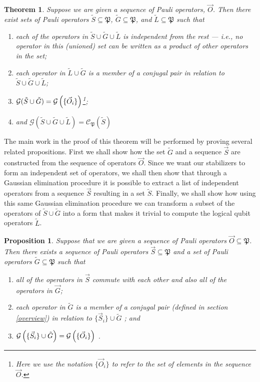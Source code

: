 \documentclass[twocolumn,showpacs,preprintnumbers,amsmath,amssymb,nofootinbib,pra,floatfix]{revtex4}
\newtheorem{theorem}{Theorem}
\newtheorem{proposition}{Proposition}
\newenvironment{remark}[1][Remark]{\begin{trivlist}
\item[\hskip \labelsep {\bfseries #1}]}{\end{trivlist}}
\newcommand{\lst}{\vec}
\newcommand{\set}{\tilde}
\newcommand{\genfun}{\mathcal{G}}
\newcommand{\pauligroup}{\mathfrak{P}}
\newcommand{\centralizer}{\mathcal{C}}
\begin{document}
\begin{theorem} \label{theorem-SG} Suppose we are given a sequence of Pauli operators, $\lst O$.  Then there exist sets of Pauli operators $\set S\subseteq\pauligroup$, $\set G\subseteq\pauligroup$, and $\set L\subseteq\pauligroup$ such that
\begin{enumerate}
\item each of the operators in $\set S \cup \set G \cup \set L$ is independent from the rest --- i.e., no operator in this (unioned) set can be written as a product of other operators in the set;
\item each operator in $\set L \cup \set G$ is a member of a conjugal pair in relation to $\set S \cup \set G \cup \set L$;
\item $\genfun(\set S \cup \set G)=\genfun\paren{\{\lst O_i\}}$\footnote{Here we use the notation $\{\vec{O}_i\}$ to refer to the set of elements in the sequence $\vec{O}$.};
\item and $\genfun(\set S \cup \set G \cup \set L)=\centralizer_\pauligroup(\set S)$
\end{enumerate}
\end{theorem}

\begin{remark}
The main work in the proof of this theorem will be performed by proving several related propositions.  First we shall show how the set $\set G$ and a sequence $\lst S$ are constructed from the sequence of operators $\lst O$.  Since we want our stabilizers to form an independent set of operators, we shall then show that through a Gaussian elimination procedure it is possible to extract a list of independent operators from a sequence $\lst S$ resulting in a set $\set S$.  Finally, we shall show how using this same Gaussian elimination procedure we can transform a subset of the operators of $\set S\cup\set G$ into a form that makes it trivial to compute the logical qubit operators $\set L$.
\end{remark}
\begin{proposition} \label{proposition-SG} Suppose that we are given a sequence of Pauli operators $\lst O\subseteq \pauligroup$.  Then there exists a sequence of Pauli operators $\lst S\subseteq\pauligroup$ and a set of Pauli operators $\set G\subseteq\pauligroup$ such that
\begin{enumerate}
\item all of the operators in $\lst S$ commute with each other and also all of the operators in $\lst G$; \label{stabs-commute-with-G}
\item each operator in $\set G$ is a member of a \emph{conjugal pair} (defined in section \ref{overview}) in relation to $\{\lst S_i\} \cup \set G $ \label{conjugal-pairs-commute-with-SAG}; and
\item $\genfun\paren{\{\lst S_i\}\cup \set G}=\genfun\paren{\{\lst O_i\}}$ \label{SAG-spans-all}.
\end{enumerate}
\end{proposition}
\end{document}
